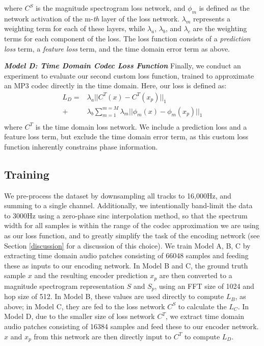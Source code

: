 \documentclass[sigconf]{acmart}
\begin{document}
where $C^{S}$ is the magnitude spectrogram loss network, and $\phi_{m}$ is defined as the network activation of the m-\textit{th} layer of the loss network. $\lambda_{m}$ represents a weighting term for each of these layers, while $\lambda_{a}$, $\lambda_{b}$, and $\lambda_{c}$ are the weighting terms for each component of the loss. The loss function consists of a \textit{prediction loss} term, a \textit{feature loss} term, and the time domain error term as above.

\textit{\textbf{Model D: Time Domain Codec Loss Function}}
Finally, we conduct an experiment to evaluate our second custom loss function, trained to approximate an MP3 codec directly in the time domain. Here, our loss is defined as:
\begin{equation}
    \begin{aligned}
        L_{D} = & \lambda_{a}||C^{T}(x) - C^{T}(x_{p})||_{1} \\
        + & \lambda_{b}\sum_{m=1}^{m=M} \lambda_{m}||\phi_{m}(x) - \phi_{m}(x_{p}) ||_{1}\\
    \end{aligned}
\end{equation}
where $C^{T}$ is the time domain loss network.  We include a prediction loss and a feature loss term, but exclude the time domain error term, as this custom loss function inherently constrains phase information.

\subsection{Training}
We pre-process the dataset by downsampling all tracks to 16,000Hz, and summing to a single channel.  Additionally, we intentionally band-limit the data to 3000Hz using a zero-phase sinc interpolation method, so that the spectrum width for all samples is within the range of the codec approximation we are using as our loss function, and to greatly simplify the task of the encoding network (see Section \ref{discussion} for a discussion of this choice).  We train Model A, B, C by extracting time domain audio patches consisting of 66048 samples and feeding these as inputs to our encoding network.  In Model B and C, the ground truth sample $x$ and the resulting encoder prediction $x_{p}$ are then converted to a magnitude spectrogram representation $S$ and $S_{p}$, using an FFT size of 1024 and hop size of 512.  In Model B, these values are used directly to compute $L_{B}$, as above; in Model C, they are fed to the loss network $C^{S}$ to calculate the $L_{C}$.  In Model D, due to the smaller size of loss network $C^{T}$, we extract time domain audio patches consisting of 16384 samples and feed these to our encoder network. $x$ and $x_{p}$ from this network are then directly input to $C^{T}$ to compute $L_{D}$.
\end{document}
